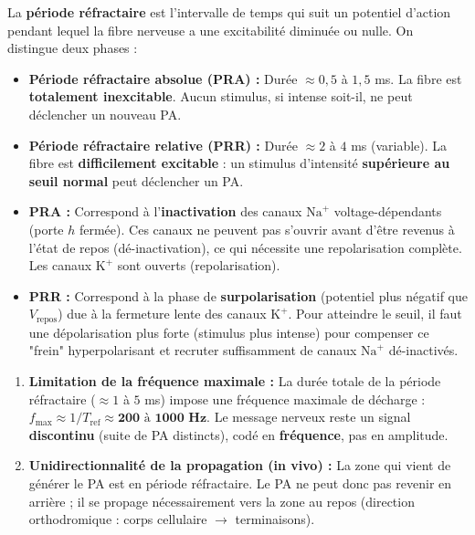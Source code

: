 \documentclass[11pt]{article}
\begin{document}
\begin{definition}
La \textbf{période réfractaire} est l'intervalle de temps qui suit un potentiel d'action pendant lequel la fibre nerveuse a une excitabilité diminuée ou nulle. On distingue deux phases :
\begin{itemize}
    \item \textbf{Période réfractaire absolue (PRA) :} Durée $\approx 0,5$ à $1,5$ ms. La fibre est \textbf{totalement inexcitable}. Aucun stimulus, si intense soit-il, ne peut déclencher un nouveau PA.
    \item \textbf{Période réfractaire relative (PRR) :} Durée $\approx 2$ à $4$ ms (variable). La fibre est \textbf{difficilement excitable} : un stimulus d'intensité \textbf{supérieure au seuil normal} peut déclencher un PA.
\end{itemize}
\end{definition}

\begin{propriete}
\begin{itemize}
    \item \textbf{PRA :} Correspond à l'\textbf{inactivation} des canaux $\text{Na}^+$ voltage-dépendants (porte $h$ fermée). Ces canaux ne peuvent pas s'ouvrir avant d'être revenus à l'état de repos (dé-inactivation), ce qui nécessite une repolarisation complète. Les canaux $\text{K}^+$ sont ouverts (repolarisation).
    \item \textbf{PRR :} Correspond à la phase de \textbf{surpolarisation} (potentiel plus négatif que $V_{\text{repos}}$) due à la fermeture lente des canaux $\text{K}^+$. Pour atteindre le seuil, il faut une dépolarisation plus forte (stimulus plus intense) pour compenser ce "frein" hyperpolarisant et recruter suffisamment de canaux $\text{Na}^+$ dé-inactivés.
\end{itemize}
\end{propriete}

\begin{aretenir}
\begin{enumerate}
    \item \textbf{Limitation de la fréquence maximale :} La durée totale de la période réfractaire ($\approx 1$ à $5$ ms) impose une fréquence maximale de décharge : $f_{\text{max}} \approx 1 / T_{\text{ref}} \approx \mathbf{200 \text{ à } 1000 \text{ Hz}}$. Le message nerveux reste un signal \textbf{discontinu} (suite de PA distincts), codé en \textbf{fréquence}, pas en amplitude.
    \item \textbf{Unidirectionnalité de la propagation (in vivo) :} La zone qui vient de générer le PA est en période réfractaire. Le PA ne peut donc pas revenir en arrière ; il se propage nécessairement vers la zone au repos (direction orthodromique : corps cellulaire $\to$ terminaisons).
\end{enumerate}
\end{aretenir}
\end{document}
